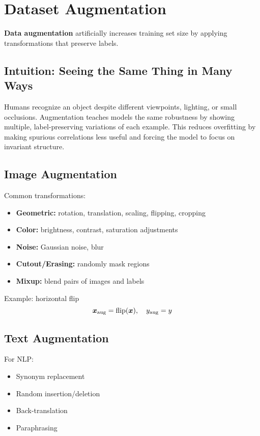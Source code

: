 
\section{Dataset Augmentation }
\label{sec:data-augmentation}

\textbf{Data augmentation} artificially increases training set size by applying transformations that preserve labels.

\subsection{Intuition: Seeing the Same Thing in Many Ways}

Humans recognize an object despite different viewpoints, lighting, or small occlusions. Augmentation teaches models the same robustness by showing multiple, label-preserving variations of each example. This reduces overfitting by making spurious correlations less useful and forcing the model to focus on invariant structure.

\subsection{Image Augmentation}

Common transformations:
\begin{itemize}
    \item \textbf{Geometric:} rotation, translation, scaling, flipping, cropping
    \item \textbf{Color:} brightness, contrast, saturation adjustments
    \item \textbf{Noise:} Gaussian noise, blur
    \item \textbf{Cutout/Erasing:} randomly mask regions
    \item \textbf{Mixup:} blend pairs of images and labels
\end{itemize}

Example: horizontal flip
\begin{equation}
\boldsymbol{x}_{\text{aug}} = \text{flip}(\boldsymbol{x}), \quad y_{\text{aug}} = y
\end{equation}

\subsection{Text Augmentation}

For NLP:
\begin{itemize}
    \item Synonym replacement
    \item Random insertion/deletion
    \item Back-translation
    \item Paraphrasing
\end{itemize}

